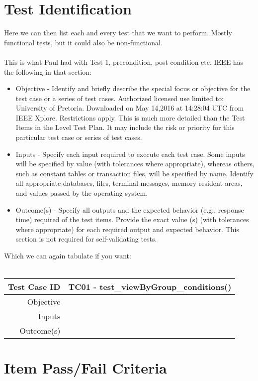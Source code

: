 \section{Test Identification}

Here we can then list each and every test that we want to perform. Mostly functional tests, but it could also be non-functional.\\\\

This is what Paul had with Test 1, precondition, post-condition etc. IEEE has the following in that section:
\begin{itemize}
	\item  Objective - Identify and briefly describe the special focus or objective for the test case or a series of test cases.
Authorized licensed use limited to: University of Pretoria. Downloaded on May 14,2016 at 14:28:04 UTC from IEEE Xplore. Restrictions apply.
This is much more detailed than the Test Items in the Level Test Plan. It may include the risk or
priority for this particular test case or series of test cases.
	\item  Inputs - Specify each input required to execute each test case. Some inputs will be specified by value (with
tolerances where appropriate), whereas others, such as constant tables or transaction files, will be
specified by name. Identify all appropriate databases, files, terminal messages, memory resident areas,
and values passed by the operating system.
	\item  Outcome(s) - Specify all outputs and the expected behavior (e.g., response time) required of the test items. Provide
the exact value (s) (with tolerances where appropriate) for each required output and expected behavior.
This section is not required for self-validating tests.
\end{itemize}

Which we can again tabulate if you want: \\\\
\begin{tabular}{ r|l } 
	\hline      
	\textbf{Test Case ID} & \textbf{TC01 - test\_viewByGroup\_conditions()}\\
	\hline
	Objective & \\
	Inputs & \\
	Outcome(s) & \\ 
	\hline
	
\end{tabular}

\section{Item Pass/Fail Criteria}
   
